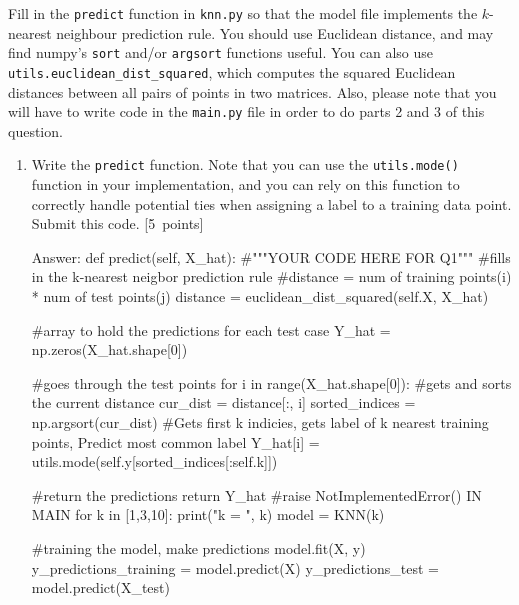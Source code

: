 \documentclass{article}
\newcommand{\blu}[1]{{\textcolor{blu}{#1}}}
\newcommand{\gre}[1]{\textcolor{gre}{#1}}
\newcommand\ans[1]{\par\gre{Answer: #1}}
\let\ask\blu
\newcommand\pts[1]{\textcolor{pointscolour}{[#1~points]}}
\begin{document}
    Fill in the \texttt{predict} function in \texttt{knn.py} so that the model file implements the $k$-nearest neighbour prediction rule.
    You should use Euclidean distance, and may find numpy's \texttt{sort} and/or \texttt{argsort} functions useful.
    You can also use \texttt{utils.euclidean\string_dist\string_squared}, which computes the squared Euclidean distances between all pairs of points in two matrices. Also, please note that you will have to write code in the \texttt{main.py} file in order to do parts 2 and 3 of this question.
    \begin{enumerate}
        \item Write the \texttt{predict} function. Note that you can use the \texttt{utils.mode()} function in your implementation, and you can rely on this function to correctly handle potential ties when assigning a label to a training data point. \ask{Submit this code.} \pts{5}
        \ans{
            def predict(self, X_hat):
        #"""YOUR CODE HERE FOR Q1"""
        #fills in the k-nearest neigbor prediction rule
        #distance = num of training points(i) * num of test points(j)
        distance = euclidean_dist_squared(self.X, X_hat)

        #array to hold the predictions for each test case
        Y_hat = np.zeros(X_hat.shape[0])

        #goes through the test points
        for i in range(X_hat.shape[0]):
            #gets and sorts the current distance
            cur_dist = distance[:, i]
            sorted_indices = np.argsort(cur_dist)
            #Gets first k indicies, gets label of k nearest training points, Predict most common label
            Y_hat[i] = utils.mode(self.y[sorted_indices[:self.k]])

        #return the predictions
        return Y_hat 
        #raise NotImplementedError()
        IN MAIN
        for k in [1,3,10]:
        print("k = ", k)
        model = KNN(k)

        #training the model, make predictions
        model.fit(X, y)
        y_predictions_training = model.predict(X)
        y_predictions_test = model.predict(X_test)

}
\end{enumerate}
\end{document}
